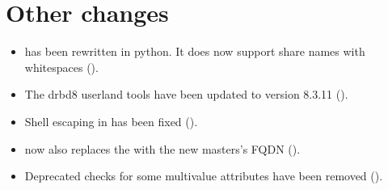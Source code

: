 \section{Other changes}
\begin{itemize}
\item {} has been rewritten in python. It does
  now support share names with whitespaces ().
\item The drbd8 userland tools have been updated to version 8.3.11 ().
\item Shell escaping in  has been fixed ().
\item {} now also replaces the
 with the new masters's FQDN ().
\item Deprecated checks for some multivalue attributes have been removed ().


\end{itemize}
